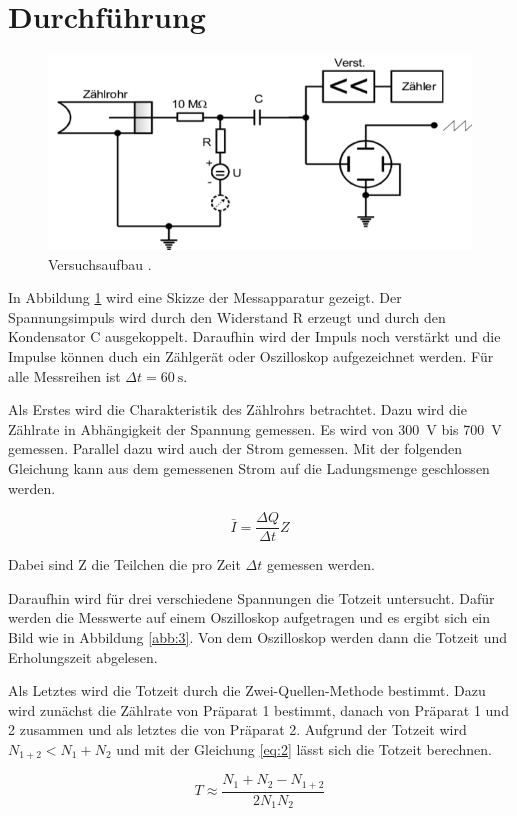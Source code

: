\section{Durchführung}

\begin{figure}[H]
  \centering
  \includegraphics[width=\textwidth]{content/Aufbau.png}
  \caption{Versuchsaufbau \cite{1}.}
  \label{abb:5}
\end{figure}

In Abbildung \ref{abb:5} wird eine Skizze der Messapparatur gezeigt. Der Spannungsimpuls
wird durch den Widerstand R erzeugt und durch den Kondensator C ausgekoppelt. Daraufhin
wird der Impuls noch verstärkt und die Impulse können duch ein Zählgerät oder Oszilloskop
aufgezeichnet werden. Für alle Messreihen ist $\Delta t = \SI{60}{\second}$.

Als Erstes wird die Charakteristik des Zählrohrs betrachtet. Dazu wird die Zählrate
in Abhängigkeit der Spannung gemessen. Es wird von \SI{300}{\volt} bis \SI{700}{\volt} gemessen.
Parallel dazu wird auch der Strom gemessen. Mit der folgenden Gleichung kann aus
dem gemessenen Strom auf die Ladungsmenge geschlossen werden.

\begin{equation}
  \bar{I} = \frac{\Delta Q}{\Delta t} Z
  \label{eq:1}
\end{equation}

Dabei sind Z die Teilchen die pro Zeit $\Delta t$ gemessen werden.

Daraufhin wird für drei verschiedene Spannungen die Totzeit untersucht. Dafür
werden die Messwerte auf einem Oszilloskop aufgetragen und es ergibt sich ein Bild
wie in Abbildung \ref{abb:3}. Von dem Oszilloskop werden dann die Totzeit und Erholungszeit
abgelesen.

Als Letztes wird die Totzeit durch die Zwei-Quellen-Methode bestimmt. Dazu wird zunächst
die Zählrate von Präparat 1 bestimmt, danach von Präparat 1 und 2 zusammen und als letztes
die von Präparat 2. Aufgrund der Totzeit wird $N_{1+2} < N_1 + N_2$ und mit der
Gleichung \ref{eq:2} lässt sich die Totzeit berechnen.

\begin{equation}
  T \approx \frac{N_1 + N_2 - N_{1+2}}{2 N_1 N_2}
  \label{eq:2}
\end{equation}
